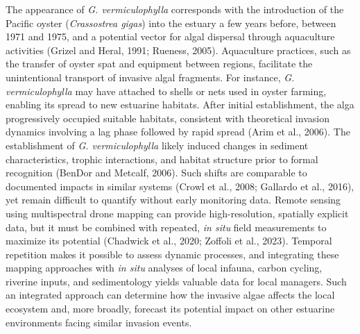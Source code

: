 \documentclass[
  letterpaper,
  11pt,
  english,
  singlespacing,
  headsepline]{MastersDoctoralThesis}
\begin{document}
\begin{spacing}{1.5}
The appearance of \emph{G. vermiculophylla} corresponds with the
introduction of the Pacific oyster (\emph{Crassostrea gigas}) into the
estuary a few years before, between 1971 and 1975, and a potential
vector for algal dispersal through aquaculture activities (Grizel and
Heral, 1991; Rueness, 2005). Aquaculture practices, such as the transfer
of oyster spat and equipment between regions, facilitate the
unintentional transport of invasive algal fragments. For instance,
\emph{G. vermiculophylla} may have attached to shells or nets used in
oyster farming, enabling its spread to new estuarine habitats. After
initial establishment, the alga progressively occupied suitable
habitats, consistent with theoretical invasion dynamics involving a lag
phase followed by rapid spread (Arim et al., 2006). The establishment of
\emph{G. vermiculophylla} likely induced changes in sediment
characteristics, trophic interactions, and habitat structure prior to
formal recognition (BenDor and Metcalf, 2006). Such shifts are
comparable to documented impacts in similar systems (Crowl et al., 2008;
Gallardo et al., 2016), yet remain difficult to quantify without early
monitoring data. Remote sensing using multispectral drone mapping can
provide high-resolution, spatially explicit data, but it must be
combined with repeated, \emph{in situ} field measurements to maximize
its potential (Chadwick et al., 2020; Zoffoli et al., 2023). Temporal
repetition makes it possible to assess dynamic processes, and
integrating these mapping approaches with \emph{in situ} analyses of
local infauna, carbon cycling, riverine inputs, and sedimentology yields
valuable data for local managers. Such an integrated approach can
determine how the invasive algae affects the local ecosystem and, more
broadly, forecast its potential impact on other estuarine environments
facing similar invasion events.


\end{spacing}
\end{document}
